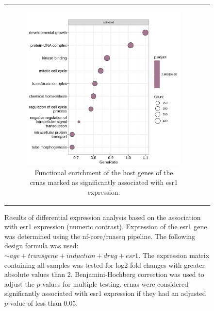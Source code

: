 \begin{figure}[H]
\begin{tabular}{cc}
\begin{subfigure}{0.5\textwidth}
            \includegraphics[width=\linewidth]{chapters/4_results_and_discussion/figures/dea/deseq2/esr1/dot.png}
            \caption{Functional enrichment of the host genes of the
                \glspl{crna} marked as significantly associated with \gls{esr1}
                expression.
            }

            \label{fig:esr1_go_terms}
        \end{subfigure}
    \end{tabular}
    \caption{Results of differential expression analysis based on the
        association with \gls{esr1} expression (numeric contrast).
        Expression of the \gls{esr1} gene was determined using the nf-core/rnaseq
        pipeline\supercite{patel_nf-corernaseq_2024}.
        The following design formula was used: $\sim age + transgene + induction + drug
            + esr1$.
        The expression matrix containing all samples was tested for log2 fold changes
        with greater absolute values than 2.
        Benjamini-Hochberg correction\supercite{benjamini_controlling_1995} was used to
        adjust the $p$-values for multiple testing.
        \Glspl{crna} were considered significantly associated with \gls{esr1}
        expression if they had an adjusted $p$-value of less than 0.05.
    }
    \label{fig:dea_esr1}
\end{figure}

